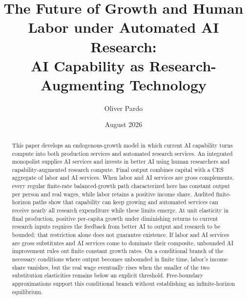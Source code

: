 \documentclass[11pt]{article}
\title{The Future of Growth and Human Labor under Automated AI Research:\\
AI Capability as Research-Augmenting Technology}
\author{Oliver Pardo}
\date{August 2026}
\theoremstyle{definition}
\begin{document}
\maketitle

\begin{abstract}
This paper develops an endogenous-growth model in which current AI capability
turns compute into both production services and automated research services. An
integrated monopolist supplies AI services and invests in better AI using human
researchers and capability-augmented research compute. Final output combines
capital with a CES aggregate of labor and AI services. When labor and AI services
are gross complements, every regular finite-rate balanced-growth path
characterized here has constant output per person and real wages, while labor
retains a positive income share. Audited finite-horizon paths show that capability
can keep growing and automated services can receive nearly all research
expenditure while these limits emerge. At unit elasticity in final production,
positive per-capita growth under diminishing returns to current research inputs
requires the feedback from better AI to output and research to be bounded; that
restriction alone does not guarantee existence. If labor and AI services are
gross substitutes and AI services come to dominate their composite, unbounded AI
improvement rules out finite constant growth rates. On a conditional branch of
the necessary conditions where output becomes unbounded in finite time, labor's
income share vanishes, but the real wage eventually rises when the smaller of the
two substitution elasticities remains below an explicit threshold. Free-boundary
approximations support this conditional branch without establishing an
infinite-horizon equilibrium.
\end{abstract}

\onehalfspacing







\appendix




\end{document}
